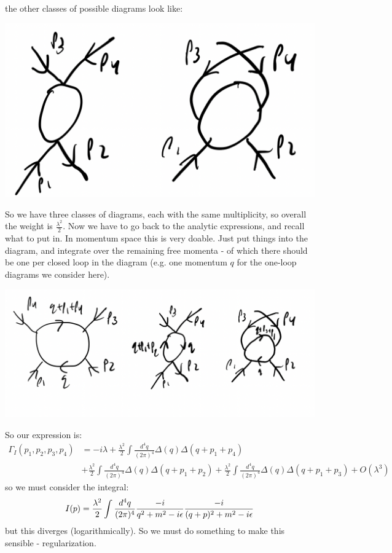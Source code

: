 the other classes of possible diagrams look like:

\begin{center}
\includegraphics[scale=0.3]{Images/fig-lec28feynman8.png}
\end{center}

So we have three classes of diagrams, each with the same multiplicity, so overall the weight is $\frac{\lambda^2}{2}$. Now we have to go back to the analytic expressions, and recall what to put in. In momentum space this is very doable. Just put things into the diagram, and integrate over the remaining free momenta - of which there should be one per closed loop in the diagram (e.g. one momentum $q$ for the one-loop diagrams we consider here).

\begin{center}
\includegraphics[scale=0.3]{Images/fig-lec28feynman9.png}
\end{center}

So our expression is:
\begin{equation}
    \begin{split}
        \Gamma_I(p_1, p_2, p_3, p_4) &= -i\lambda + \frac{\lambda^2}{2}\int \frac{d^4q}{(2\pi)^4}\Delta(q)\Delta(q + p_1 + p_4) 
        \\ &+ \frac{\lambda^2}{2}\int \frac{d^4q}{(2\pi)^4}\Delta(q)\Delta(q + p_1 + p_2) + \frac{\lambda^2}{2}\int \frac{d^4q}{(2\pi)^4}\Delta(q)\Delta(q + p_1 + p_3) + O(\lambda^3)
    \end{split}
\end{equation}
so we must consider the integral:
\begin{equation}
    I(p) = \frac{\lambda^2}{2}\int \frac{d^4q}{(2\pi)^4}\frac{-i}{q^2 + m^2 - i\epsilon} \frac{-i}{(q+p)^2 + m^2 - i\epsilon}
\end{equation}
but this diverges (logarithmically). So we must do something to make this sensible - regularization. 

